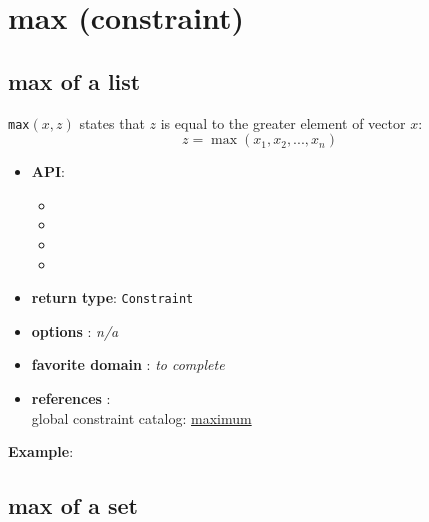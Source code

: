 \label{max}
\hypertarget{max}{}

\section{max (constraint)}\label{max:maxconstraint}\hypertarget{max:maxconstraint}{}

\subsection{max of a list}\label{max:maxofalist}\hypertarget{max:maxofalist}{}

\begin{notedef}
\texttt{max}$(x,z)$ states that $z$ is equal to the greater element of vector $x$:
$$z = \max(x_1, x_2, ..., x_n)$$  
\end{notedef}

\begin{itemize}
	\item \textbf{API}:
	\begin{itemize}
		\item {}
		\item {}
		\item {}
		\item {}
	\end{itemize}
	\item \textbf{return type}: \texttt{Constraint}
	\item \textbf{options} : \emph{n/a}
	\item \textbf{favorite domain} : \emph{to complete}
	\item \textbf{references} :\\
      global constraint catalog: \href{http://www.emn.fr/x-info/sdemasse/gccat/Cmaximum.html}{maximum}
\end{itemize}

\textbf{Example}:


\subsection{max of a set}\label{max:maxofaset}\hypertarget{max:maxofaset}{}

